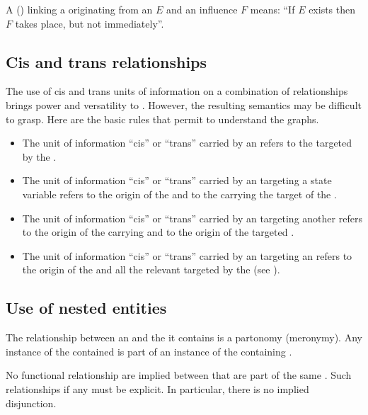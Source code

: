\noindent
A  () linking a  originating from an  $E$ and an influence $F$ means: ``If $E$ exists then $F$ takes place, but not immediately''.\\[\baselineskip]

\subsection{Cis and trans relationships}

The use of cis and trans units of information on a combination of relationships brings power and versatility to \ERs. However, the resulting semantics may be difficult to grasp. Here are the basic rules that permit to understand the graphs.

\begin{itemize}
 \item The unit of information ``cis'' or ``trans'' carried by an  refers to the  targeted by the . 
 \item The unit of information ``cis'' or ``trans'' carried by an  targeting a state variable  refers to the origin of the  and to the  carrying the target of the . 
\item The unit of information ``cis'' or ``trans'' carried by an  targeting another  refers to the origin of the carrying  and to the origin of the targeted .
 \item The unit of information ``cis'' or ``trans'' carried by an  targeting an  refers to the origin of the  and all the relevant  targeted by the  (see ).
\end{itemize}

\subsection{Use of nested entities}\label{sec:semanticsDomain}

\noindent
The relationship between an  and the  it contains is a partonomy (meronymy). Any instance of the contained  is part of an instance of the containing .

\noindent
No functional relationship are implied between  that are part of the same . Such relationships if any must be explicit. In particular, there is no implied disjunction.

